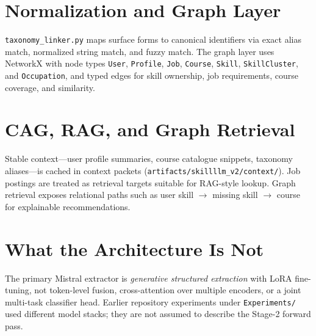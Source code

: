 \section{Normalization and Graph Layer}

\texttt{taxonomy\_linker.py} maps surface forms to canonical identifiers via exact alias match, normalized string match, and fuzzy match.
The graph layer uses NetworkX with node types \texttt{User}, \texttt{Profile}, \texttt{Job}, \texttt{Course}, \texttt{Skill}, \texttt{SkillCluster}, and \texttt{Occupation}, and typed edges for skill ownership, job requirements, course coverage, and similarity.

\section{CAG, RAG, and Graph Retrieval}

Stable context---user profile summaries, course catalogue snippets, taxonomy aliases---is cached in context packets (\texttt{artifacts/skillllm\_v2/context/}).
Job postings are treated as retrieval targets suitable for RAG-style lookup.
Graph retrieval exposes relational paths such as user skill $\rightarrow$ missing skill $\rightarrow$ course for explainable recommendations.

\section{What the Architecture Is Not}

The primary Mistral extractor is \emph{generative structured extraction} with LoRA fine-tuning, not token-level fusion, cross-attention over multiple encoders, or a joint multi-task classifier head.
Earlier repository experiments under \texttt{Experiments/} used different model stacks; they are not assumed to describe the Stage-2 forward pass.
